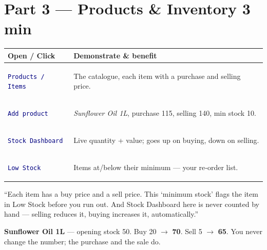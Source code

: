 \documentclass[11pt,a4paper,openany]{article}
\makeatletter
\newcommand{\rupee}{{\rupeefont \symbol{"20B9}}}
\newcommand{\ui}[1]{\colorbox{panel}{\rule[-3pt]{0pt}{11pt}\texttt{\textcolor{navy}{#1}}}}
\newcommand{\dur}[1]{\hfill{\sffamily\footnotesize\color{brandgreen}\textbf{#1}}}
\newenvironment{flow}{\par\small\begin{tabularx}{\linewidth}{@{}>{\bfseries\color{navy}}p{3.4cm} X@{}}\toprule
 Open / Click & Demonstrate \& benefit \\\midrule}{\bottomrule\end{tabularx}\par}
\makeatother
\begin{document}
\section{Part 3 — Products \& Inventory \dur{3 min}}
\begin{flow}
\ui{Products / Items} & The catalogue, each item with a purchase and selling price. \\
\ui{Add product} & \emph{Sunflower Oil 1L}, purchase \rupee115, selling \rupee140, min stock 10. \\
\ui{Stock Dashboard} & Live quantity + value; goes up on buying, down on selling. \\
\ui{Low Stock} & Items at/below their minimum — your re‑order list. \\
\end{flow}
\begin{say}
``Each item has a buy price and a sell price. This `minimum stock' flags the item in
Low Stock before you run out. And Stock Dashboard here is never counted by hand —
selling reduces it, buying increases it, automatically.''
\end{say}
\begin{tcolorbox}[colback=white,colframe=panelborder,boxrule=0.8pt,arc=3pt,left=9pt,right=9pt,top=6pt,bottom=6pt,
  fonttitle=\sffamily\bfseries\color{navy},title={Worked example},enhanced]
\textbf{Sunflower Oil 1L} — opening stock 50. Buy 20 $\to$ \textbf{70}. Sell 5 $\to$ \textbf{65}.
You never change the number; the purchase and the sale do.
\end{tcolorbox}

\end{document}

